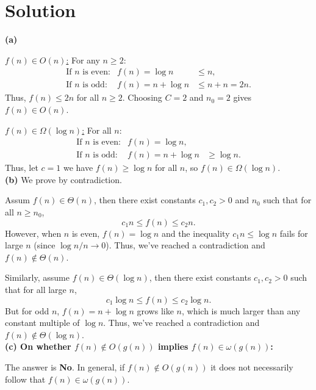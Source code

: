\documentclass[11pt]{article}
\begin{document}
    \section*{Solution}
    \textbf{(a)}

    \underline{\(f(n)\in O(n)\):}  
    For any \(n\ge 2\):
    \[
    \begin{array}{rcl}
    \text{If } n \text{ is even:} & f(n)= \log n &\le n,\\[1mm]
    \text{If } n \text{ is odd:} & f(n)= n+\log n &\le n+n = 2n.
    \end{array}
    \]
    Thus, \(f(n)\le 2n\) for all \(n\ge 2\). Choosing \(C=2\) and \(n_0=2\) gives \(f(n)\in O(n)\).

    \underline{\(f(n)\in \Omega(\log n)\):}  
    For all \(n\):
    \[
    \begin{array}{rcl}
    \text{If } n \text{ is even:} & f(n)= \log n,\\[1mm]
    \text{If } n \text{ is odd:} & f(n)= n+\log n &\ge \log n.
    \end{array}
    \]
    Thus, let \(c=1\) we have \(f(n)\ge \log n\) for all \(n\), so \(f(n)\in \Omega(\log n)\).
    \\
    \textbf{(b)}
    \medskip We prove by contradiction.
    
    Assum \(f(n)\in \Theta(n)\), then there exist constants \(c_1, c_2>0\) and \(n_0\) such that for all \(n\ge n_0\),
    \[
    c_1 n \le f(n) \le c_2 n.
    \]
    However, when \(n\) is even, \(f(n)=\log n\) and the inequality \(c_1 n \le \log n\) fails for large \(n\) (since \(\log n/n\to 0\)). Thus, we've reached a contradiction and \(f(n)\notin \Theta(n)\).

    Similarly, assume \(f(n)\in \Theta(\log n)\), then there exist constants \(c_1, c_2>0\) such that for all large \(n\),
    \[
    c_1 \log n \le f(n) \le c_2 \log n.
    \]
    But for odd \(n\), \(f(n)= n+\log n\) grows like \(n\), which is much larger than any constant multiple of \(\log n\). Thus, we've reached a contradiction and \(f(n)\notin \Theta(\log n)\).
    \\
    \textbf{(c) On whether \(f(n)\notin O(g(n))\) implies \(f(n)\in \omega(g(n))\):}

    The answer is \textbf{No}. In general, if \(f(n)\notin O(g(n))\) it does not necessarily follow that \(f(n)\in \omega(g(n))\).
\end{document}
